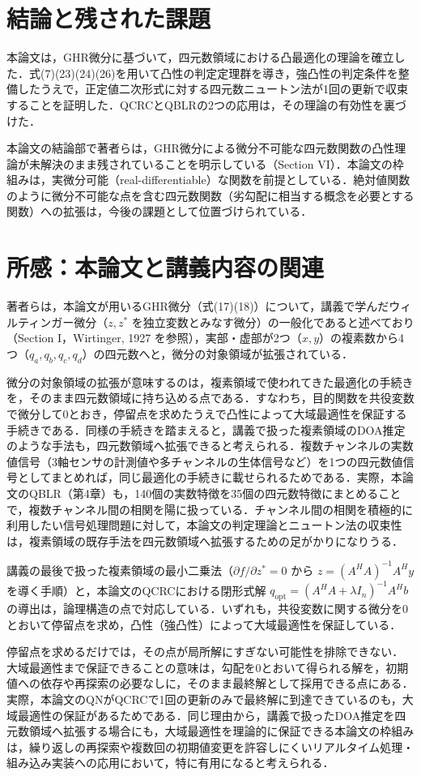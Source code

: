\documentclass[twocolumn, 9pt]{jsarticle}
\begin{document}
\section{結論と残された課題}

本論文は，GHR微分に基づいて，四元数領域における凸最適化の理論を確立した．式(7)(23)(24)(26)を用いて凸性の判定定理群を導き，強凸性の判定条件を整備したうえで，正定値二次形式に対する四元数ニュートン法が1回の更新で収束することを証明した．QCRCとQBLRの2つの応用は，その理論の有効性を裏づけた．

本論文の結論部で著者らは，GHR微分による微分不可能な四元数関数の凸性理論が未解決のまま残されていることを明示している（Section VI）．本論文の枠組みは，実微分可能（real-differentiable）な関数を前提としている．絶対値関数のように微分不可能な点を含む四元数関数（劣勾配に相当する概念を必要とする関数）への拡張は，今後の課題として位置づけられている．

\section{所感：本論文と講義内容の関連}

著者らは，本論文が用いるGHR微分（式(17)(18)）について，講義で学んだウィルティンガー微分（$z,z^*$ を独立変数とみなす微分）の一般化であると述べており（Section I，Wirtinger, 1927 を参照），実部・虚部が2つ（$x,y$）の複素数から4つ（$q_a,q_b,q_c,q_d$）の四元数へと，微分の対象領域が拡張されている．

微分の対象領域の拡張が意味するのは，複素領域で使われてきた最適化の手続きを，そのまま四元数領域に持ち込める点である．すなわち，目的関数を共役変数で微分して0とおき，停留点を求めたうえで凸性によって大域最適性を保証する手続きである．同様の手続きを踏まえると，講義で扱った複素領域のDOA推定のような手法も，四元数領域へ拡張できると考えられる．複数チャンネルの実数値信号（3軸センサの計測値や多チャンネルの生体信号など）を1つの四元数値信号としてまとめれば，同じ最適化の手続きに載せられるためである．実際，本論文のQBLR（第4章）も，140個の実数特徴を35個の四元数特徴にまとめることで，複数チャンネル間の相関を陽に扱っている．チャンネル間の相関を積極的に利用したい信号処理問題に対して，本論文の判定理論とニュートン法の収束性は，複素領域の既存手法を四元数領域へ拡張するための足がかりになりうる．

講義の最後で扱った複素領域の最小二乗法（$\partial f/\partial z^*=0$ から $z=(A^HA)^{-1}A^Hy$ を導く手順）と，本論文のQCRCにおける閉形式解 $q_{\mathrm{opt}}=(A^HA+\lambda I_n)^{-1}A^Hb$ の導出は，論理構造の点で対応している．いずれも，共役変数に関する微分を0とおいて停留点を求め，凸性（強凸性）によって大域最適性を保証している．

停留点を求めるだけでは，その点が局所解にすぎない可能性を排除できない．大域最適性まで保証できることの意味は，勾配を0とおいて得られる解を，初期値への依存や再探索の必要なしに，そのまま最終解として採用できる点にある．実際，本論文のQNがQCRCで1回の更新のみで最終解に到達できているのも，大域最適性の保証があるためである．同じ理由から，講義で扱ったDOA推定を四元数領域へ拡張する場合にも，大域最適性を理論的に保証できる本論文の枠組みは，繰り返しの再探索や複数回の初期値変更を許容しにくいリアルタイム処理・組み込み実装への応用において，特に有用になると考えられる．
\end{document}
